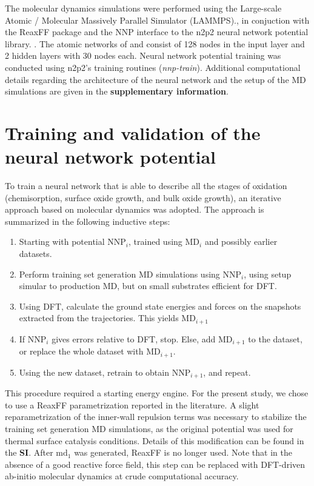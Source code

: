 \documentclass[manuscript=cmatex]{achemso}
\begin{document}
The molecular dynamics simulations were performed using the Large-scale Atomic / Molecular Massively Parallel Simulator (LAMMPS).\cite{thompson_lammps_2022}, in conjuction with the ReaxFF package\cite{aktulga_parallel_2012} and the NNP interface to the n2p2 neural network potential library. \cite{singraber_library-based_2019}. The atomic networks of  and  consist of 128 nodes in the input layer and 2 hidden layers with 30 nodes each. Neural network potential training was conducted using n2p2's training routines (\textit{nnp-train}).\cite{singraber_parallel_2019} Additional computational details regarding the architecture of the neural network and the setup of the MD simulations are given in the \textbf{supplementary information}.

\section{Training and validation of the neural network potential}
To train a neural network that is able to describe all the stages of oxidation (chemisorption, surface oxide growth, and bulk oxide growth), an iterative approach based on molecular dynamics was adopted. The approach is summarized in the following inductive steps:
\begin{enumerate}
\item Starting with potential \textbf{$\mathrm{NNP}_i$}, trained using $\mathrm{MD}_i$ and possibly earlier datasets.
\item Perform training set generation MD simulations using \textbf{$\mathrm{NNP}_i$}, using setup simular to production MD, but on small substrates efficient for DFT. 
\item Using DFT, calculate the ground state energies and forces on the snapshots extracted from the trajectories. This yields $\mathrm{MD}_{i+1}$
\item If \textbf{$\mathrm{NNP}_i$} gives errors relative to DFT, stop. Else, add $\mathrm{MD}_{i+1}$ to the dataset, or replace the whole dataset with $\mathrm{MD}_{i+1}$.
\item Using the new dataset, retrain to obtain \textbf{$\mathrm{NNP}_{i+1}$}, and repeat.
\end{enumerate}
This procedure required a starting energy engine. For the present study, we chose to use a ReaxFF parametrization reported in the literature\cite{zhu_development_2020}. A slight reparametrization of the inner-wall repulsion terms was necessary to stabilize the training set generation MD simulations, as the original potential was used for thermal surface catalysis conditions. Details of this modification can be found in the \textbf{SI}. After $\mathrm{md}_1$ was generated, ReaxFF is no longer used. Note that in the absence of a good reactive force field, this step can be replaced with DFT-driven ab-initio molecular dynamics at crude computational accuracy.
\end{document}
